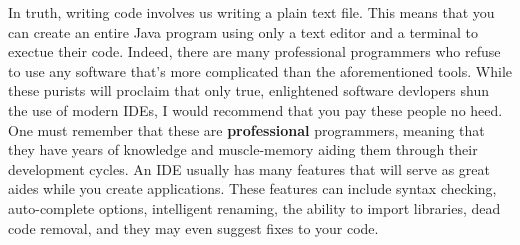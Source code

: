 In truth, writing code involves us writing a plain text file.
This means that you can create an entire Java program using only a text editor and a terminal to exectue their code.
Indeed, there are many professional programmers who refuse to use any software that's more complicated than the aforementioned tools.
While these purists will proclaim that only true, enlightened software devlopers shun the use of modern \gls{IDE}s, I would recommend that you pay these people no heed.
One must remember that these are \textbf{professional} programmers, meaning that they have years of knowledge and muscle-memory aiding them through their development cycles.
An \gls{IDE} usually has many features that will serve as great aides while you create applications.
These features can include syntax checking, auto-complete options, intelligent renaming, the ability to import libraries, dead code removal, and they may even suggest fixes to your code.


